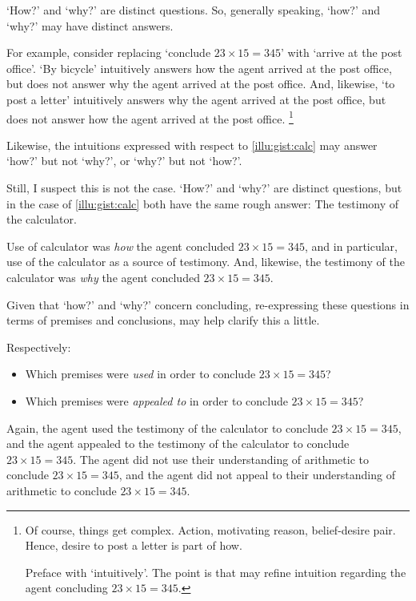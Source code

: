 \begin{note}
  `How?' and `why?' are distinct questions.
  So, generally speaking, `how?' and `why?' may have distinct answers.

  For example, consider replacing `conclude \(23 \times 15 = 345\)'  with `arrive at the post office'.
  `By bicycle' intuitively answers how the agent arrived at the post office, but does not answer why the agent arrived at the post office.
  And, likewise, `to post a letter' intuitively answers why the agent arrived at the post office, but does not answer how the agent arrived at the post office.%
  \footnote{
    Of course, things get complex.
    Action, motivating reason, belief-desire pair.
    Hence, desire to post a letter is part of how.

    Preface with `intuitively'.
    The point is that may refine intuition regarding the agent concluding \(23 \times 15 = 345\).
  }

  Likewise, the intuitions expressed with respect to \autoref{illu:gist:calc} may answer `how?' but not `why?', or `why?' but not `how?'.

  Still, I suspect this is not the case.
  `How?' and `why?' are distinct questions, but in the case of \autoref{illu:gist:calc} both have the same rough answer:
  The testimony of the calculator.

  Use of calculator was \emph{how} the agent concluded \(23 \times 15 = 345\), and in particular, use of the calculator as a source of testimony.
  And, likewise, the testimony of the calculator was \emph{why} the agent concluded \(23 \times 15 = 345\).

  Given that `how?' and `why?' concern concluding, re-expressing these questions in terms of premises and conclusions, may help clarify this a little.

  Respectively:

  \begin{itemize}
  \item
    Which premises were \emph{used} in order to conclude \(23 \times 15 = 345\)?
  \item
    Which premises were \emph{appealed to} in order to conclude \(23 \times 15 = 345\)?
  \end{itemize}

  Again, the agent used the testimony of the calculator to conclude \(23 \times 15 = 345\), and the agent appealed to the testimony of the calculator to conclude \(23 \times 15 = 345\).
  The agent did not use their understanding of arithmetic to conclude \(23 \times 15 = 345\), and the agent did not appeal to their understanding of arithmetic to conclude \(23 \times 15 = 345\).
\end{note}

